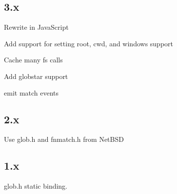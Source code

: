 \subsection*{3.\+x}


\begin{DoxyItemize}
\item Rewrite in Java\+Script
\item Add support for setting root, cwd, and windows support
\item Cache many fs calls
\item Add globstar support
\item emit match events
\end{DoxyItemize}

\subsection*{2.\+x}


\begin{DoxyItemize}
\item Use {\ttfamily glob.\+h} and {\ttfamily fnmatch.\+h} from Net\+B\+SD
\end{DoxyItemize}

\subsection*{1.\+x}


\begin{DoxyItemize}
\item {\ttfamily glob.\+h} static binding. 
\end{DoxyItemize}